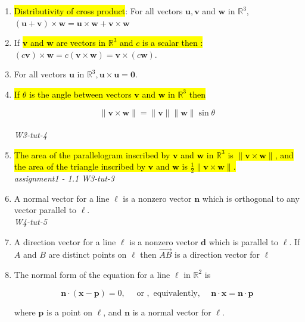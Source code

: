 \documentclass[10pt]{article}
\begin{document}
\begin{enumerate}
\item  \hl{Distributivity of cross product}: For all vectors $\mathbf{u}, \mathbf{v}$ and $\mathbf{w}$ in $\mathbb{R}^{3}$, $(\mathbf{u}+\mathbf{v}) \times \mathbf{w}=\mathbf{u} \times \mathbf{w}+\mathbf{v} \times \mathbf{w}$

\item  If \hl{$\mathbf{v}$ and $\mathbf{w}$ are vectors in $\mathbb{R}^{3}$ and $c$ is a scalar then : }$(c \mathbf{v}) \times \mathbf{w}=c(\mathbf{v} \times \mathbf{w})=\mathbf{v} \times(c \mathbf{w})$.

\item  For all vectors $\mathbf{u}$ in $\mathbb{R}^{3}, \mathbf{u} \times \mathbf{u}=\mathbf{0}$.

\item  \hl{If $\theta$ is the angle between vectors $\mathbf{v}$ and $\mathbf{w}$ in $\mathbb{R}^{3}$ then}

$$
\|\mathbf{v} \times \mathbf{w}\|=\|\mathbf{v}\|\|\mathbf{w}\| \sin \theta
$$
\\
\textit{W3-tut-4}

\item  \hl{The area of the parallelogram inscribed by $\mathbf{v}$ and $\mathbf{w}$ in $\mathbb{R}^{3}$ is $\|\mathbf{v} \times \mathbf{w}\|$, and the area of the triangle inscribed by $\mathbf{v}$ and $\mathbf{w}$ is $\frac{1}{2}\|\mathbf{v} \times \mathbf{w}\|$.}\\

\textit{assignment1 - 1.1}
\textit{W3-tut-3}

\item  A normal vector for a line $\ell$ is a nonzero vector $\mathbf{n}$ which is orthogonal to any vector parallel to $\ell$.\\
\textit{W4-tut-5}

\item  A direction vector for a line $\ell$ is a nonzero vector $\mathbf{d}$ which is parallel to $\ell$. If $A$ and $B$ are distinct points on $\ell$ then $\overrightarrow{A B}$ is a direction vector for $\ell$

\item  The normal form of the equation for a line $\ell$ in $\mathbb{R}^{2}$ is

$$
\mathbf{n} \cdot(\mathbf{x}-\mathbf{p})=0, \quad \text { or }, \text { equivalently, } \quad \mathbf{n} \cdot \mathbf{x}=\mathbf{n} \cdot \mathbf{p}
$$

where $\mathbf{p}$ is a point on $\ell$, and $\mathbf{n}$ is a normal vector for $\ell$.


\end{enumerate}
\end{document}
